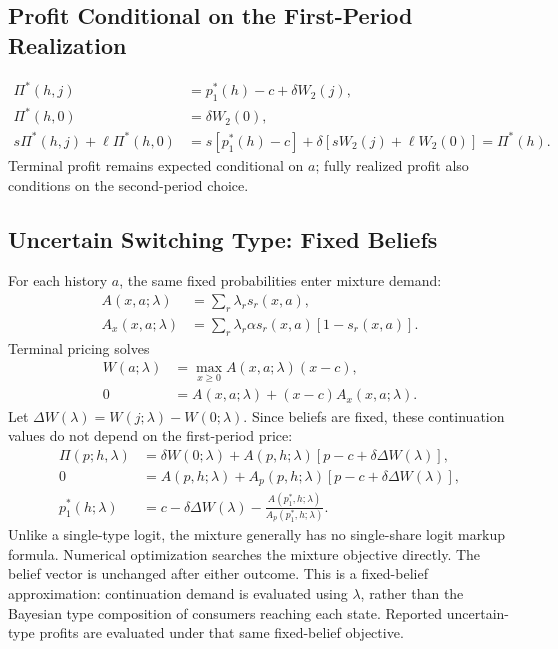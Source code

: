 \documentclass[12pt]{article}
\theoremstyle{definition}
\theoremstyle{remark}
\begin{document}
\subsection{Profit Conditional on the First-Period Realization}
\begin{align}
 \Pi^*(h,j)&=p_1^*(h)-c+\delta W_2(j),\\
 \Pi^*(h,0)&=\delta W_2(0),\\
 s\Pi^*(h,j)+\ell\Pi^*(h,0)
 &=s[p_1^*(h)-c]+\delta[sW_2(j)+\ell W_2(0)]
 =\Pi^*(h).
\end{align}
Terminal profit remains expected conditional on $a$; fully realized profit also
conditions on the second-period choice.

\subsection{Uncertain Switching Type: Fixed Beliefs}
\label{app:gamma-uncertainty}
For each history $a$, the same fixed probabilities enter mixture demand:
\begin{align}
 A(x,a;\lambda)&=\sum_r\lambda_rs_r(x,a),\\
 A_x(x,a;\lambda)&=\sum_r\lambda_r\alpha s_r(x,a)[1-s_r(x,a)].
\end{align}
Terminal pricing solves
\begin{align}
 W(a;\lambda)&=\max_{x\geq 0} A(x,a;\lambda)(x-c),\\
 0&=A(x,a;\lambda)+(x-c)A_x(x,a;\lambda).
\end{align}
Let $\Delta W(\lambda)=W(j;\lambda)-W(0;\lambda)$. Since beliefs are fixed,
these continuation values do not depend on the first-period price:
\begin{align}
 \Pi(p;h,\lambda)
 &=\delta W(0;\lambda)
 +A(p,h;\lambda)[p-c+\delta\Delta W(\lambda)],\\
 0&=A(p,h;\lambda)
 +A_p(p,h;\lambda)[p-c+\delta\Delta W(\lambda)],\\
 p_1^*(h;\lambda)
 &=c-\delta\Delta W(\lambda)
 -\frac{A(p_1^*,h;\lambda)}{A_p(p_1^*,h;\lambda)}.
\end{align}
Unlike a single-type logit, the mixture generally has no single-share logit
markup formula. Numerical optimization searches the mixture objective directly.
The belief vector is unchanged after either outcome. This is a fixed-belief
approximation: continuation demand is evaluated using $\lambda$, rather than the
Bayesian type composition of consumers reaching each state. Reported uncertain-type
profits are evaluated under that same fixed-belief objective.
\end{document}

